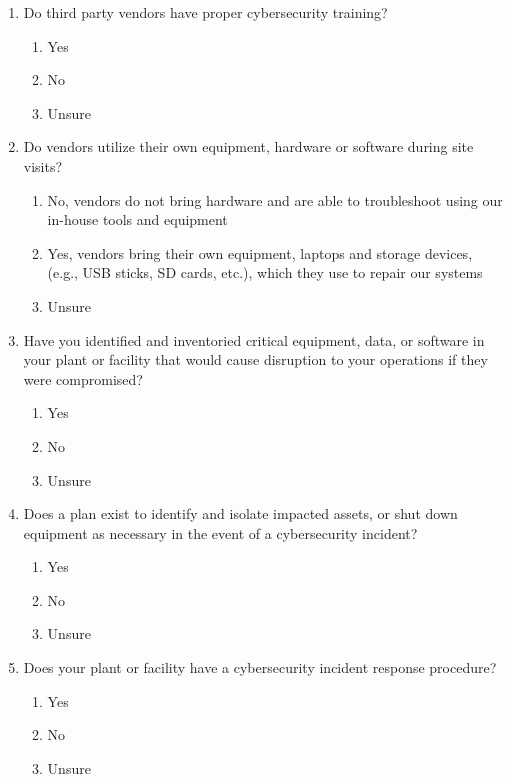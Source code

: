 \documentclass[./main.tex]{subfiles}
\begin{document}
\begin{enumerate}[label=\textbf{Q\arabic*.}]
\item Do third party vendors have proper cybersecurity training?
\begin{enumerate}
    \item Yes
    \item No
    \item Unsure
\end{enumerate}

\clearpage

\item Do vendors utilize their own equipment, hardware or software during site visits?
\begin{enumerate}
    \item No, vendors do not bring hardware and are able to troubleshoot using our in-house tools and equipment
    \item Yes, vendors bring their own equipment, laptops and storage devices, (e.g., USB sticks, SD cards, etc.), which they use to repair our systems
    \item Unsure
\end{enumerate}

\item Have you identified and inventoried critical equipment, data, or software in your plant or facility that would cause disruption to your operations if they were compromised?
\begin{enumerate}
    \item Yes
    \item No
    \item Unsure
\end{enumerate}

\item Does a plan exist to identify and isolate impacted assets, or shut down equipment as necessary in the event of a cybersecurity incident?
\begin{enumerate}
    \item Yes
    \item No
    \item Unsure
\end{enumerate}

\item Does your plant or facility have a cybersecurity incident response procedure?
\begin{enumerate}
    \item Yes
    \item No
    \item Unsure
\end{enumerate}


\end{enumerate}
\end{document}
